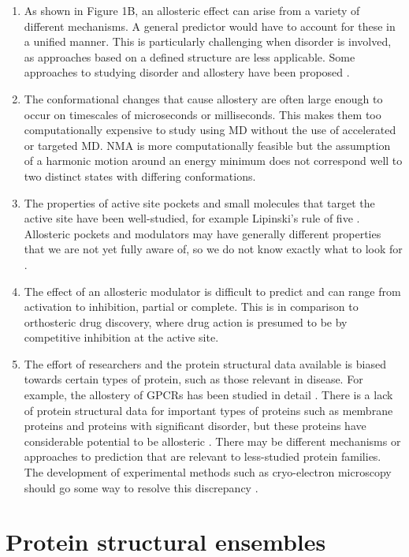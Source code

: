 \begin{enumerate}
\item As shown in Figure 1B, an allosteric effect can arise from a variety of different mechanisms.
A general predictor would have to account for these in a unified manner.
This is particularly challenging when disorder is involved, as approaches based on a defined structure are less applicable.
Some approaches to studying disorder and allostery have been proposed \cite{Singh2017, Wang2017}.
\item The conformational changes that cause allostery are often large enough to occur on timescales of microseconds or milliseconds.
This makes them too computationally expensive to study using MD without the use of accelerated or targeted MD.
NMA is more computationally feasible but the assumption of a harmonic motion around an energy minimum does not correspond well to two distinct states with differing conformations.
\item The properties of active site pockets and small molecules that target the active site have been well-studied, for example Lipinski's rule of five \cite{Lipinski2001}.
Allosteric pockets and modulators may have generally different properties that we are not yet fully aware of, so we do not know exactly what to look for \cite{VanWesten2014, Wang2012}.
\item The effect of an allosteric modulator is difficult to predict and can range from activation to inhibition, partial or complete.
This is in comparison to orthosteric drug discovery, where drug action is presumed to be by competitive inhibition at the active site.
\item The effort of researchers and the protein structural data available is biased towards certain types of protein, such as those relevant in disease.
For example, the allostery of GPCRs has been studied in detail \cite{Wootten2013, Conn2009}.
There is a lack of protein structural data for important types of proteins such as membrane proteins and proteins with significant disorder, but these proteins have considerable potential to be allosteric \cite{Motlagh2014}.
There may be different mechanisms or approaches to prediction that are relevant to less-studied protein families.
The development of experimental methods such as cryo-electron microscopy should go some way to resolve this discrepancy \cite{Ozorowski2017}.
\end{enumerate}


\section{Protein structural ensembles}

